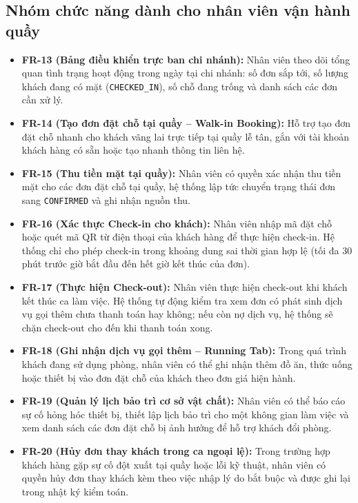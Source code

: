\subsection{Nhóm chức năng dành cho nhân viên vận hành quầy}
\begin{itemize}
    \item \textbf{FR-13 (Bảng điều khiển trực ban chi nhánh):} Nhân viên theo dõi tổng quan tình trạng hoạt động trong ngày tại chi nhánh: số đơn sắp tới, số lượng khách đang có mặt (\texttt{CHECKED\_IN}), số chỗ đang trống và danh sách các đơn cần xử lý.
    \item \textbf{FR-14 (Tạo đơn đặt chỗ tại quầy -- Walk-in Booking):} Hỗ trợ tạo đơn đặt chỗ nhanh cho khách vãng lai trực tiếp tại quầy lễ tân, gắn với tài khoản khách hàng có sẵn hoặc tạo nhanh thông tin liên hệ.
    \item \textbf{FR-15 (Thu tiền mặt tại quầy):} Nhân viên có quyền xác nhận thu tiền mặt cho các đơn đặt chỗ tại quầy, hệ thống lập tức chuyển trạng thái đơn sang \texttt{CONFIRMED} và ghi nhận nguồn thu.
    \item \textbf{FR-16 (Xác thực Check-in cho khách):} Nhân viên nhập mã đặt chỗ hoặc quét mã QR từ điện thoại của khách hàng để thực hiện check-in. Hệ thống chỉ cho phép check-in trong khoảng dung sai thời gian hợp lệ (tối đa 30 phút trước giờ bắt đầu đến hết giờ kết thúc của đơn).
    \item \textbf{FR-17 (Thực hiện Check-out):} Nhân viên thực hiện check-out khi khách kết thúc ca làm việc. Hệ thống tự động kiểm tra xem đơn có phát sinh dịch vụ gọi thêm chưa thanh toán hay không; nếu còn nợ dịch vụ, hệ thống sẽ chặn check-out cho đến khi thanh toán xong.
    \item \textbf{FR-18 (Ghi nhận dịch vụ gọi thêm -- Running Tab):} Trong quá trình khách đang sử dụng phòng, nhân viên có thể ghi nhận thêm đồ ăn, thức uống hoặc thiết bị vào đơn đặt chỗ của khách theo đơn giá hiện hành.
    \item \textbf{FR-19 (Quản lý lịch bảo trì cơ sở vật chất):} Nhân viên có thể báo cáo sự cố hỏng hóc thiết bị, thiết lập lịch bảo trì cho một không gian làm việc và xem danh sách các đơn đặt chỗ bị ảnh hưởng để hỗ trợ khách đổi phòng.
    \item \textbf{FR-20 (Hủy đơn thay khách trong ca ngoại lệ):} Trong trường hợp khách hàng gặp sự cố đột xuất tại quầy hoặc lỗi kỹ thuật, nhân viên có quyền hủy đơn thay khách kèm theo việc nhập lý do bắt buộc và được ghi lại trong nhật ký kiểm toán.
\end{itemize}

